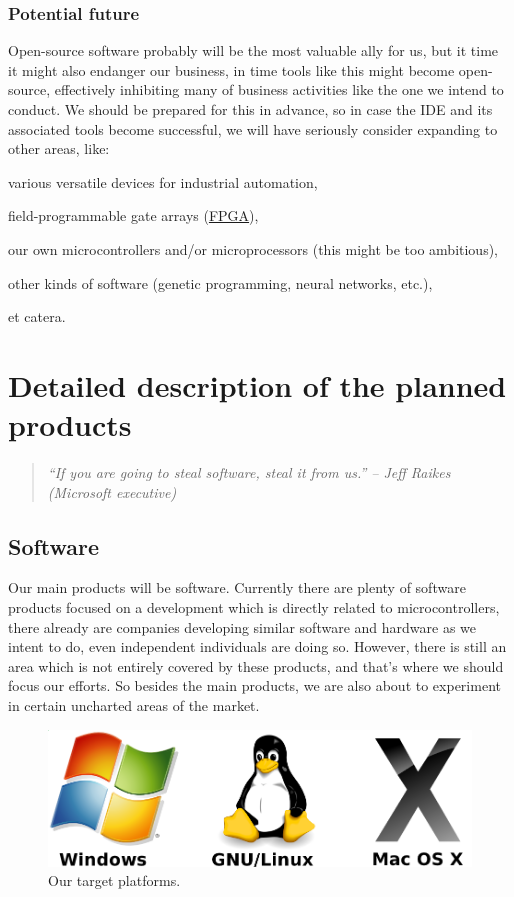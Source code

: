 \documentclass[a4paper,twoside,15pt]{book}
\begin{document}
		\subsection{Potential future}
			Open-source software probably will be the most valuable ally for us, but it time it might also endanger our business, in time tools like this might become open-source, effectively inhibiting many of business activities like the one we intend to conduct. We should be prepared for this in advance, so in case the IDE and its associated tools become successful, we will have seriously consider expanding to other areas, like:
			\begin{dinglist}{73}
				\item various versatile devices for industrial automation,
				\item field-programmable gate arrays (\href{http://en.wikipedia.org/wiki/Programmable_gate_array}{FPGA}),
				\item our own microcontrollers and/or microprocessors (this might be too ambitious),
				\item other kinds of software (genetic programming, neural networks, etc.),
				\item et catera.
			\end{dinglist}

\chapter{Detailed description of the planned products}
	\begin{quote}
		\textit{``If you are going to steal software, steal it from us.'' -- Jeff Raikes (Microsoft executive)}
	\end{quote}

	\section{Software}
		Our main products will be software. Currently there are plenty of software products focused on a development which is directly related to microcontrollers, there already are companies developing similar software and hardware as we intent to do, even independent individuals are doing so. However, there is still an area which is not entirely covered by these products, and that's where we should focus our efforts. So besides the main products, we are also about to experiment in certain uncharted areas of the market.

		\begin{figure}[h!]
			\centering{}
			\includegraphics[width=.5\textwidth]{images/os.png}
			\caption{Our target platforms.}
		\end{figure}
\end{document}
